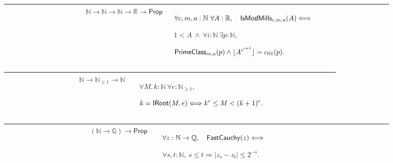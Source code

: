 \documentclass[12pt,reqno]{amsart}
\theoremstyle{blueplain}
\numberwithin{equation}{section}
\begin{document}
{\scriptsize \setlength{\parskip}{0pt}\nointerlineskip
\noindent 
\begin{tabular}{|@{}>{\centering\arraybackslash}m{0.19251\linewidth}|>{\centering\arraybackslash}m{0.16845\linewidth}|>{\centering\arraybackslash}m{0.53904\linewidth}|}
\hline
{\hypertarget{def:IsModMills}{$\mathsf{IsModMills}$}} & {$\mathbb{N}\to%
\mathbb{N}\to\mathbb{N}\to\mathbb{R}\to\mathsf{Prop}$} & {$\displaystyle %
\forall c,m,a:\mathbb{N}\ \forall A:\mathbb{R},\quad \hyperlink{def:IsModMills}%
{\mathsf{IsModMills} }_{c,m,a}(A)\Longleftrightarrow$ \par$\displaystyle %
1<A\ \wedge\ \forall i:\mathbb{N}\ \exists p:\mathbb{N},$ \par$\displaystyle 
\hyperlink{def:PrimeClass}{\mathsf{PrimeClass} }_{m,a}(p)\wedge\lfloor
A^{c^{i+1}}\rfloor=\iota_{\mathbb{N}\mathbb{Z}}(p).$} \\ \hline
\end{tabular}%
}

{\scriptsize \setlength{\parskip}{0pt}\nointerlineskip
\noindent 
\begin{tabular}{|@{}>{\centering\arraybackslash}m{0.19251\linewidth}|>{\centering\arraybackslash}m{0.16845\linewidth}|>{\centering\arraybackslash}m{0.53904\linewidth}|}
\hline
{\hypertarget{def:IRoot}{$\mathsf{IRoot}$}} & {$\mathbb{N}\to\mathbb{N}%
_{\ge1}\to\mathbb{N}$} & {$\displaystyle \forall M,k:\mathbb{N}\ \forall e:%
\mathbb{N}_{\ge1},$ \par$\displaystyle k=\hyperlink{def:IRoot}{\mathsf{IRoot}
}(M,e)\Longleftrightarrow k^e\le M<(k+1)^e.$} \\ \hline
\end{tabular}%
}

{\scriptsize \setlength{\parskip}{0pt}\nointerlineskip
\noindent 
\begin{tabular}{|@{}>{\centering\arraybackslash}m{0.19251\linewidth}|>{\centering\arraybackslash}m{0.16845\linewidth}|>{\centering\arraybackslash}m{0.53904\linewidth}|}
\hline
{\hypertarget{def:FastCauchy}{$\mathsf{FastCauchy}$}} & {$(\mathbb{N}\to%
\mathbb{Q})\to\mathsf{Prop}$} & {$\displaystyle \forall z:\mathbb{N}\to%
\mathbb{Q},\quad \hyperlink{def:FastCauchy}{\mathsf{FastCauchy} }%
(z)\Longleftrightarrow$ \par$\displaystyle \forall s,t:\mathbb{N},\ s\le
t\Rightarrow|z_s-z_t|\le2^{-s}.$} \\ \hline
\end{tabular}%
}
\end{document}
